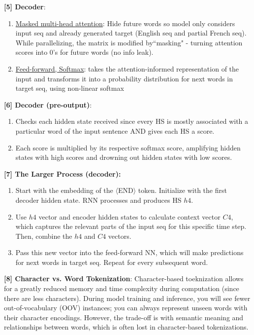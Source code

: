 \textbf{[5] Decoder}:
\begin{enumerate}
    \item \underline{Masked multi-head attention}: Hide future words so model only considers input seq and already generated target (English seq and partial French seq). While parallelizing, the matrix is modified by``masking" - turning attention scores into $0$'s for future words (no info leak).
    \item \underline{Feed-forward, Softmax}: takes the attention-informed representation of the input and transforms it into a probability distribution for next words in target seq, using non-linear softmax
\end{enumerate}
\textbf{[6] Decoder (pre-output)}:
\begin{enumerate}
    \item Checks each hidden state received since every HS is mostly associated with a particular word of the input sentence AND gives each HS a score.
    \item Each score is multiplied by its respective softmax score, amplifying hidden states with high scores and drowning out hidden states with low scores.
\end{enumerate}
\textbf{[7] The Larger Process (decoder):}
\begin{enumerate}
    \item Start with the embedding of the $\langle$END$\rangle$ token. Initialize with the first decoder hidden state. RNN processes and produces HS $h4$.
    \item Use $h4$ vector and encoder hidden states to calculate context vector $C4$, which captures the relevant parts of the input seq for this specific time step. Then, combine the $h4$ and $C4$ vectors.
    \item Pass this new vector into the feed-forward NN, which will make predictions for next words in target seq. Repeat for every subsequent word.
\end{enumerate}
\textbf{[8] Character vs. Word Tokenization}: Character-based toeknization allows for a greatly reduced memory and time complexity during computation (since there are less characters). During model training and inference, you will see fewer out-of-vocabulary (OOV) instances; you can always represent unseen words with their character encodings. However, the trade-off is with semantic meaning and relationships between words, which is often lost in character-based tokenizations.\\
\\
